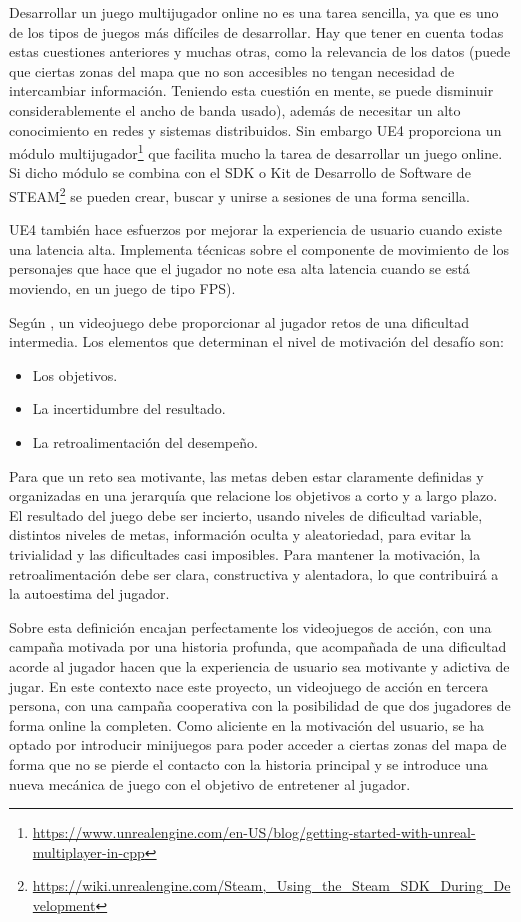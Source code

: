 Desarrollar un juego multijugador online no es una tarea sencilla, ya que es uno de los tipos de juegos más difíciles de desarrollar. Hay que tener en cuenta todas estas cuestiones anteriores y muchas otras, como la relevancia de los datos (puede que ciertas zonas del mapa que no son accesibles no tengan necesidad de intercambiar información. Teniendo esta cuestión en mente, se puede disminuir considerablemente el ancho de banda usado), además de necesitar un alto conocimiento en redes y sistemas distribuidos. Sin embargo \acs{UE4} proporciona un módulo multijugador\footnote{\url{https://www.unrealengine.com/en-US/blog/getting-started-with-unreal-multiplayer-in-cpp}} que facilita mucho la tarea de desarrollar un juego online. Si dicho módulo se combina con el \ac{SDK} o Kit de Desarrollo de Software de STEAM\footnote{\url{https://wiki.unrealengine.com/Steam,_Using_the_Steam_SDK_During_Development}} se pueden crear, buscar y unirse a sesiones de una forma sencilla.

\acs{UE4} también hace esfuerzos por mejorar la experiencia de usuario cuando existe una latencia alta. Implementa técnicas sobre el componente de movimiento de los personajes que hace que el jugador no note esa alta latencia cuando se está moviendo, en un juego de tipo \acs{FPS}).

Según \cite{10}, un videojuego debe proporcionar al jugador retos de una dificultad intermedia. Los elementos que determinan el nivel de motivación del desafío son:

\begin{itemize}
\item Los objetivos.
\item La incertidumbre del resultado.
\item La retroalimentación del desempeño.
\end{itemize}

Para que un reto sea motivante, las metas deben estar claramente definidas y organizadas en una jerarquía que relacione los objetivos a corto y a largo plazo. El resultado del juego debe ser incierto, usando niveles de dificultad variable, distintos niveles de metas, información oculta y aleatoriedad, para evitar la trivialidad y las dificultades casi imposibles. Para mantener la motivación, la retroalimentación debe ser clara, constructiva y alentadora, lo que contribuirá a la autoestima del jugador.

Sobre esta definición encajan perfectamente los videojuegos de acción, con una campaña motivada por una historia profunda, que acompañada de una dificultad acorde al jugador hacen que la experiencia de usuario sea motivante y adictiva de jugar. En este contexto nace este proyecto, un videojuego de acción en tercera persona, con una campaña cooperativa con la posibilidad de que dos jugadores de forma online la completen. Como aliciente en la motivación del usuario, se ha optado por introducir minijuegos para poder acceder a ciertas zonas del mapa de forma que no se pierde el contacto con la historia principal y se introduce una nueva mecánica de juego con el objetivo de entretener al jugador. 

